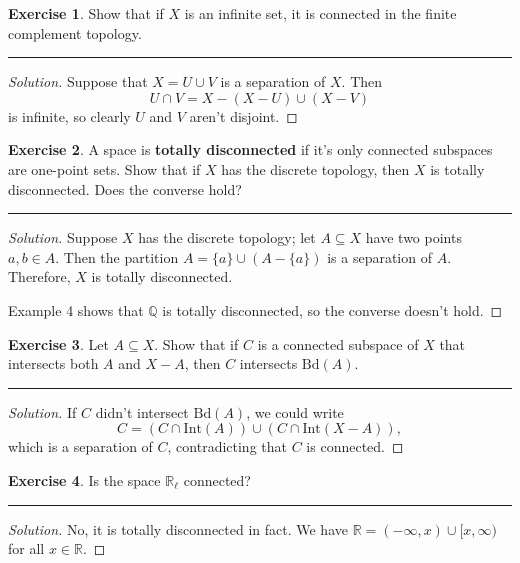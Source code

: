 \documentclass{article}
\theoremstyle{definition}
\newtheorem{exercise}{Exercise}[section]
\begin{document}
\pagebreak

\begin{exercise}
  Show that if $X$ is an infinite set, it is connected in the finite complement topology.
\end{exercise}
\hrule
\begin{proof}[Solution]
  Suppose that $X = U\cup V$ is a separation of $X$. Then
  $$U\cap V = X - (X-U)\cup (X-V)$$
  is infinite, so clearly $U$ and $V$ aren't disjoint.
\end{proof}

\pagebreak

\begin{exercise}
  A space is \textbf{totally disconnected} if it's only connected subspaces are one-point sets. Show that if $X$ has the discrete topology, then $X$ is totally disconnected. Does the converse hold?
\end{exercise}
\hrule
\begin{proof}[Solution]
  Suppose $X$ has the discrete topology; let $A\subseteq X$ have two points $a,b\in A$. Then the partition $A = \{a\}\cup (A-\{a\})$ is a separation of $A$. Therefore, $X$ is totally disconnected.

  Example 4 shows that $\mathbb{Q}$ is totally disconnected, so the converse doesn't hold.
\end{proof}

\pagebreak

\begin{exercise}
  Let $A\subseteq X$. Show that if $C$ is a connected subspace of $X$ that intersects both $A$ and $X-A$, then $C$ intersects $\mathrm{Bd}(A)$.
\end{exercise}
\hrule
\begin{proof}[Solution]
  If $C$ didn't intersect $\mathrm{Bd}(A)$, we could write
  $$C = (C\cap\mathrm{Int}(A))\cup (C\cap\mathrm{Int}(X-A)),$$
  which is a separation of $C$, contradicting that $C$ is connected.
\end{proof}

\pagebreak

\begin{exercise}
  Is the space $\mathbb{R}_\ell$ connected?
\end{exercise}
\hrule
\begin{proof}[Solution]
  No, it is totally disconnected in fact. We have $\mathbb{R} = (-\infty,x)\cup[x,\infty)$ for all $x\in\mathbb{R}$.
\end{proof}

\pagebreak
\end{document}
